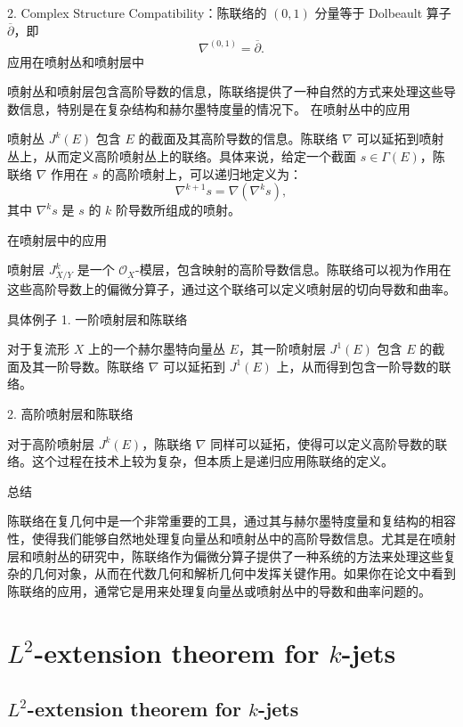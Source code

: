 \documentclass[lang=cn,12pt,fontset=none,a4paper]{beautybook}
\begin{document}
2. Complex Structure Compatibility：陈联络的 $(0,1)$ 分量等于 Dolbeault 算子 $\overline{\partial}$，即
$$
   \nabla^{(0,1)} = \overline{\partial}.
$$
应用在喷射丛和喷射层中

喷射丛和喷射层包含高阶导数的信息，陈联络提供了一种自然的方式来处理这些导数信息，特别是在复杂结构和赫尔墨特度量的情况下。
在喷射丛中的应用

喷射丛 $J^k(E)$ 包含 $E$ 的截面及其高阶导数的信息。陈联络 $\nabla$ 可以延拓到喷射丛上，从而定义高阶喷射丛上的联络。具体来说，给定一个截面 $s \in \Gamma(E)$，陈联络 $\nabla$ 作用在 $s$ 的高阶喷射上，可以递归地定义为：
$$
   \nabla^{k+1} s = \nabla (\nabla^k s),
$$
其中 $\nabla^k s$ 是 $s$ 的 $k$ 阶导数所组成的喷射。

在喷射层中的应用

喷射层 $J^k_{X/Y}$ 是一个 $\mathcal{O}_X$-模层，包含映射的高阶导数信息。陈联络可以视为作用在这些高阶导数上的偏微分算子，通过这个联络可以定义喷射层的切向导数和曲率。

具体例子
1. 一阶喷射层和陈联络

对于复流形 $X$ 上的一个赫尔墨特向量丛 $E$，其一阶喷射层 $J^1(E)$ 包含 $E$ 的截面及其一阶导数。陈联络 $\nabla$ 可以延拓到 $J^1(E)$ 上，从而得到包含一阶导数的联络。

2. 高阶喷射层和陈联络

对于高阶喷射层 $J^k(E)$，陈联络 $\nabla$ 同样可以延拓，使得可以定义高阶导数的联络。这个过程在技术上较为复杂，但本质上是递归应用陈联络的定义。

总结

陈联络在复几何中是一个非常重要的工具，通过其与赫尔墨特度量和复结构的相容性，使得我们能够自然地处理复向量丛和喷射丛中的高阶导数信息。尤其是在喷射层和喷射丛的研究中，陈联络作为偏微分算子提供了一种系统的方法来处理这些复杂的几何对象，从而在代数几何和解析几何中发挥关键作用。如果你在论文中看到陈联络的应用，通常它是用来处理复向量丛或喷射丛中的导数和曲率问题的。

\part{\texorpdfstring{$L^2$}{}-extension theorem for \texorpdfstring{$k$}{}-jets }
\chapter{\texorpdfstring{$L^2$}{}-extension theorem for \texorpdfstring{$k$}{}-jets }
\end{document}
